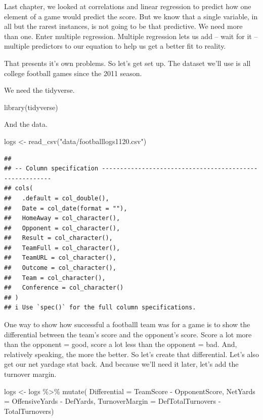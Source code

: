 \documentclass[
]{book}
\newenvironment{Shaded}{\begin{snugshade}}{\end{snugshade}}
\newcommand{\AttributeTok}[1]{\textcolor[rgb]{0.77,0.63,0.00}{#1}}
\newcommand{\FunctionTok}[1]{\textcolor[rgb]{0.00,0.00,0.00}{#1}}
\newcommand{\NormalTok}[1]{#1}
\newcommand{\OtherTok}[1]{\textcolor[rgb]{0.56,0.35,0.01}{#1}}
\newcommand{\SpecialCharTok}[1]{\textcolor[rgb]{0.00,0.00,0.00}{#1}}
\newcommand{\StringTok}[1]{\textcolor[rgb]{0.31,0.60,0.02}{#1}}
\begin{document}
Last chapter, we looked at correlations and linear regression to predict how one element of a game would predict the score. But we know that a single variable, in all but the rarest instances, is not going to be that predictive. We need more than one. Enter multiple regression. Multiple regression lets us add -- wait for it -- multiple predictors to our equation to help us get a better fit to reality.

That presents it's own problems. So let's get set up. The dataset we'll use is all college football games since the 2011 season.

We need the tidyverse.

\begin{Shaded}
\begin{Highlighting}[]
\FunctionTok{library}\NormalTok{(tidyverse)}
\end{Highlighting}
\end{Shaded}

And the data.

\begin{Shaded}
\begin{Highlighting}[]
\NormalTok{logs }\OtherTok{\textless{}{-}} \FunctionTok{read\_csv}\NormalTok{(}\StringTok{"data/footballlogs1120.csv"}\NormalTok{)}
\end{Highlighting}
\end{Shaded}

\begin{verbatim}
## 
## -- Column specification --------------------------------------------------------
## cols(
##   .default = col_double(),
##   Date = col_date(format = ""),
##   HomeAway = col_character(),
##   Opponent = col_character(),
##   Result = col_character(),
##   TeamFull = col_character(),
##   TeamURL = col_character(),
##   Outcome = col_character(),
##   Team = col_character(),
##   Conference = col_character()
## )
## i Use `spec()` for the full column specifications.
\end{verbatim}

One way to show how successful a footballl team was for a game is to show the differential between the team's score and the opponent's score. Score a lot more than the opponent = good, score a lot less than the opponent = bad. And, relatively speaking, the more the better. So let's create that differential. Let's also get our net yardage stat back. And because we'll need it later, let's add the turnover margin.

\begin{Shaded}
\begin{Highlighting}[]
\NormalTok{logs }\OtherTok{\textless{}{-}}\NormalTok{ logs }\SpecialCharTok{\%\textgreater{}\%} \FunctionTok{mutate}\NormalTok{(}
  \AttributeTok{Differential =}\NormalTok{ TeamScore }\SpecialCharTok{{-}}\NormalTok{ OpponentScore, }
  \AttributeTok{NetYards =}\NormalTok{ OffensiveYards }\SpecialCharTok{{-}}\NormalTok{ DefYards, }
  \AttributeTok{TurnoverMargin =}\NormalTok{ DefTotalTurnovers }\SpecialCharTok{{-}}\NormalTok{ TotalTurnovers)}
\end{Highlighting}
\end{Shaded}
\end{document}
